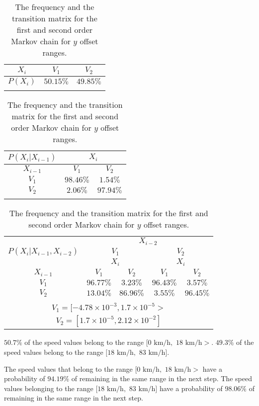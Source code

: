 \documentclass[preprint,12pt]{elsarticle}
\begin{document}
\begin{table}[!ht]
\centering
\begin{tabular}{|c|c|c|}
\hline
$X_{i}$ & $V_{1}$ & $V_{2}$\\ \hline
$P(X_{i})$ & $50.15\%$ & $49.85\%$\\ \hline
\multicolumn{3}{c}{}\\
\end{tabular}

\begin{tabular}{|c|c|c|}
\hline
$P(X_{i}|X_{i-1})$ & \multicolumn{2}{|c|}{$X_{i}$}\\ \hline
$X_{i-1}$ & $V_{1}$ & $V_{2}$\\ \hline
$V_{1}$ & $98.46\%$ & $1.54\%$\\ \hline
$V_{2}$ & $2.06\%$ & $97.94\%$\\ \hline
\multicolumn{3}{c}{}\\
\end{tabular}

\begin{tabular}{|c|c|c|c|c|}
\hline
\multirow{3}{*}{$P(X_{i}|X_{i-1},X_{i-2})$} & \multicolumn{4}{|c|}{$X_{i-2}$}\\ \cline{2-5}
 & \multicolumn{2}{|c|}{$V_{1}$} & \multicolumn{2}{|c|}{$V_{2}$}\\ \cline{2-5}
 & \multicolumn{2}{|c|}{$X_{i}$} & \multicolumn{2}{|c|}{$X_{i}$}\\ \hline
$X_{i-1}$ & $V_{1}$ & $V_{2}$ & $V_{1}$ & $V_{2}$\\ \hline
$V_{1}$ & $96.77\%$ & $3.23\%$ & $96.43\%$ & $3.57\%$\\ \hline
$V_{2}$ & $13.04\%$ & $86.96\%$ & $3.55\%$ & $96.45\%$\\ \hline
\multicolumn{5}{c}{}\\
\multicolumn{5}{c}{$V_{1} = [-4.78 \times 10^{-3}, 1.7 \times 10^{-5}>$}\\
\multicolumn{5}{c}{$V_{2} = [1.7 \times 10^{-5}, 2.12 \times 10^{-2}]$}\\
\end{tabular}
\caption{The frequency and the transition matrix for the first and second order Markov chain for $y$ offset ranges.}
\label{tab:latitude_no_abs}
\end{table}

$50.7\%$ of the speed values belong to the range $[0$ $\mathrm{km/h},$ $18$ $\mathrm{km/h}>$. $49.3\%$ of the speed values belong to the range $[18$ $\mathrm{km/h},$ $83$ $\mathrm{km/h}]$.

The speed values that belong to the range $[0$ $\mathrm{km/h},$ $18$ $\mathrm{km/h}>$ have a probability of $94.19\%$ of remaining in the same range in the next step. The speed values belonging to the range $[18$ $\mathrm{km/h},$ $83$ $\mathrm{km/h}]$ have a probability of $98.06\%$ of remaining in the same range in the next step.
\end{document}
